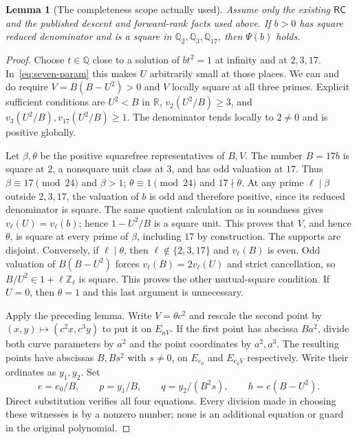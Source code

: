 \documentclass[11pt]{article}
\newtheorem{lemma}[theorem]{Lemma}
\theoremstyle{definition}
\theoremstyle{remark}
\begin{document}
\begin{lemma}[The completeness scope actually used]
\label{lem:original-seven-parity-completeness}
Assume only the existing $\mathsf{RC}$ and the published descent and
forward-rank facts used above. If $b>0$ has square reduced denominator
and is a square in $\mathbb Q_2,\mathbb Q_3,\mathbb Q_{17}$, then
$\Psi(b)$ holds.
\end{lemma}
\begin{proof}
Choose $t\in\mathbb Q$ close to a solution of $bt^2=1$ at infinity
and at $2,3,17$. In~\eqref{eq:seven-param} this makes $U$ arbitrarily
small at those places. We can and do require
$V=B(B-U^2)>0$ and $V$ locally square at all three primes.
Explicit sufficient conditions are $U^2<B$ in $\mathbb R$,
$v_2(U^2/B)\ge3$, and $v_3(U^2/B),v_{17}(U^2/B)\ge1$.
The denominator tends locally to $2\ne0$ and is positive globally.

Let $\beta,\theta$ be the positive squarefree representatives of
$B,V$. The number $B=17b$ is square at $2$, a nonsquare unit class
at $3$, and has odd valuation at $17$. Thus
$\beta\equiv17\pmod{24}$ and $\beta>1$;
$\theta\equiv1\pmod{24}$ and $17\nmid\theta$.
At any prime $\ell\mid\beta$ outside $2,3,17$, the valuation of
$b$ is odd and therefore positive, since its reduced denominator is
square. The same quotient calculation as in soundness gives
$v_\ell(U)=v_\ell(b)$; hence $1-U^2/B$ is a square unit.
This proves that $V$, and hence $\theta$, is square at every prime
of $\beta$, including $17$ by construction. The supports are disjoint.
Conversely, if $\ell\mid\theta$, then $\ell\notin\{2,3,17\}$
and $v_\ell(B)$ is even. Odd valuation of $B(B-U^2)$ forces
$v_\ell(B)=2v_\ell(U)$ and strict cancellation, so
$B/U^2\in1+\ell\mathbb Z_\ell$ is square. This proves the other
mutual-square condition. If $U=0$, then $\theta=1$ and this last
argument is unnecessary.

Apply the preceding lemma. Write $V=\theta c^2$ and rescale the
second point by $(x,y)\mapsto(c^2x,c^3y)$ to put it on $E_{nV}$.
If the first point has abscissa $Ba^2$, divide both curve parameters
by $a^2$ and the point coordinates by $a^2,a^3$. The resulting
points have abscissas $B,Bs^2$ with $s\ne0$, on $E_{e_0}$ and
$E_{e_0V}$ respectively. Write their ordinates as $y_1,y_2$.
Set
\[
 e=e_0/B,\qquad p=y_1/B,\qquad
 q=y_2/(B^2s),\qquad h=e(B-U^2).
\]
Direct substitution verifies all four equations. Every division
made in choosing these witnesses is by a nonzero number; none is
an additional equation or guard in the original polynomial.
\end{proof}
\end{document}
